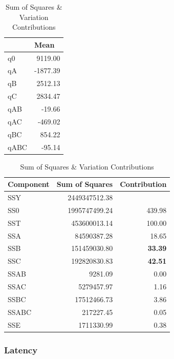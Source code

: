 \documentclass[11pt,a4paper]{article}
\begin{document}
\begin{table}[H]
	\begin{minipage}{.5\linewidth}
	\caption{Table of q values}
	\centering
	\begin{tabular}{|l|r|}
		\hline
		& \multicolumn{1}{l|}{Mean} \\ \hline
		q0 & 9119.00 \\ \hline
		qA & -1877.39 \\ \hline
		qB & 2512.13 \\ \hline
		qC & 2834.47 \\ \hline
		qAB & -19.66 \\ \hline
		qAC & -469.02 \\ \hline
		qBC & 854.22 \\ \hline
		qABC & -95.14 \\ \hline
	\end{tabular}
	\end{minipage}%
	\begin{minipage}{.5\linewidth}
	\caption{Sum of Squares \& Variation Contributions}
	\centering
	\begin{tabular}{|l|r|r|}
		\hline
		Component & \multicolumn{1}{l|}{Sum of Squares} & \multicolumn{1}{l|}{Contribution} \\ \hline
		SSY & 2449347512.38 & \multicolumn{1}{l|}{} \\ \hline
		SS0 & 1995747499.24 & 439.98 \\ \hline
		SST & 453600013.14 & 100.00 \\ \hline
		SSA & 84590387.28 & 18.65 \\ \hline
		SSB & 151459030.80 & \textbf{33.39} \\ \hline
		SSC & 192820830.83 & \textbf{42.51} \\ \hline
		SSAB & 9281.09 & 0.00 \\ \hline
		SSAC & 5279457.97 & 1.16 \\ \hline
		SSBC & 17512466.73 & 3.86 \\ \hline
		SSABC & 217227.45 & 0.05 \\ \hline
		SSE & 1711330.99 & 0.38 \\ \hline
	\end{tabular}
	\end{minipage} 
\end{table}

\subsubsection{Latency}
\end{document}
